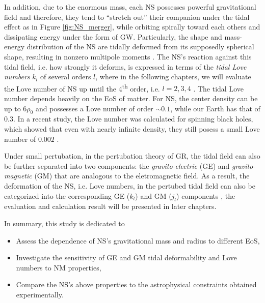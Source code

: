 In addition, due to the enormous mass, each \gls{NS} possesses powerful gravitational field and therefore, they tend to ``stretch out'' their companion under the tidal effect as in Figure \ref{fig:NS_merger}, while orbiting spirally toward each others and dissipating energy under the form of \gls{GW}. Particularly, the shape and mass-energy distribution of the \gls{NS} are tidally deformed from its supposedly spherical shape, resulting in nonzero multipole moments \cite{hinderer2008tidal,hinderer2010tidal,damour2009relativistic}. The \gls{NS}'s reaction against this tidal field, i.e. how strongly it deforms, is expressed in terms of the \emph{tidal Love numbers} $k_l$ of several orders $l$, where in the following chapters, we will evaluate the Love number of \gls{NS} up until the 4\textsuperscript{th} order, i.e. $l=2,3,4$ \cite{perot2021role}. The tidal Love number depends heavily on the \gls{EoS} of matter. For \gls{NS}, the center density can be up to $6\rho_0$ and possesses a Love number of order $\sim 0.1$, while our Earth has that of $0.3$. In a recent study, the Love number was calculated for spinning black holes, which showed that even with nearly infinite density, they still posess a small Love number of $0.002$ \cite{le2021spinning}.\par
Under small pertubation, in the pertubation theory of \gls{GR}, the tidal field can also be further separated into two components: the \emph{gravito-electric} (\gls{GE}) and \emph{gravito-magnetic} (\gls{GM}) \cite{damour2009relativistic} that are analogous to the eletromagnetic field. As a result, the deformation of the \gls{NS}, i.e. Love numbers, in the pertubed tidal field can also be categorized into the corresponding \gls{GE} ($k_l$) and \gls{GM} ($j_l$) components \cite{perot2021role}, the evaluation and calculation result will be presented in later chapters.\par
In summary, this study is dedicated to
\begin{itemize}
        \item Assess the dependence of \gls{NS}'s gravitational mass and radius to different \gls{EoS},
        \item Investigate the sensitivity of \gls{GE} and \gls{GM} tidal deformability and Love numbers to \gls{NM} properties,
        \item Compare the \gls{NS}'s above properties to the astrophysical constraints obtained experimentally.
\end{itemize}
